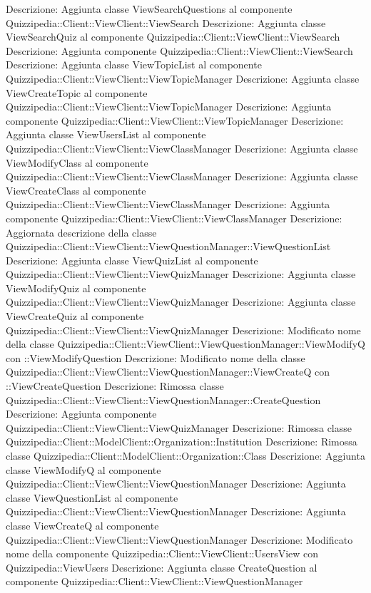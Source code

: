 Descrizione: Aggiunta classe ViewSearchQuestions al componente Quizzipedia::Client::ViewClient::ViewSearch 
Descrizione: Aggiunta classe ViewSearchQuiz al componente Quizzipedia::Client::ViewClient::ViewSearch 
Descrizione: Aggiunta componente Quizzipedia::Client::ViewClient::ViewSearch 
Descrizione: Aggiunta classe ViewTopicList al componente Quizzipedia::Client::ViewClient::ViewTopicManager 
Descrizione: Aggiunta classe ViewCreateTopic al componente Quizzipedia::Client::ViewClient::ViewTopicManager 
Descrizione: Aggiunta componente Quizzipedia::Client::ViewClient::ViewTopicManager 
Descrizione: Aggiunta classe ViewUsersList al componente Quizzipedia::Client::ViewClient::ViewClassManager 
Descrizione: Aggiunta classe ViewModifyClass al componente Quizzipedia::Client::ViewClient::ViewClassManager 
Descrizione: Aggiunta classe ViewCreateClass al componente Quizzipedia::Client::ViewClient::ViewClassManager 
Descrizione: Aggiunta componente Quizzipedia::Client::ViewClient::ViewClassManager 
Descrizione: Aggiornata descrizione della classe Quizzipedia::Client::ViewClient::ViewQuestionManager::ViewQuestionList 
Descrizione: Aggiunta classe ViewQuizList al componente Quizzipedia::Client::ViewClient::ViewQuizManager 
Descrizione: Aggiunta classe ViewModifyQuiz al componente Quizzipedia::Client::ViewClient::ViewQuizManager 
Descrizione: Aggiunta classe ViewCreateQuiz al componente Quizzipedia::Client::ViewClient::ViewQuizManager 
Descrizione: Modificato nome della classe Quizzipedia::Client::ViewClient::ViewQuestionManager::ViewModifyQ con ::ViewModifyQuestion 
Descrizione: Modificato nome della classe Quizzipedia::Client::ViewClient::ViewQuestionManager::ViewCreateQ con ::ViewCreateQuestion 
Descrizione: Rimossa classe Quizzipedia::Client::ViewClient::ViewQuestionManager::CreateQuestion 
Descrizione: Aggiunta componente Quizzipedia::Client::ViewClient::ViewQuizManager 
Descrizione: Rimossa classe Quizzipedia::Client::ModelClient::Organization::Institution 
Descrizione: Rimossa classe Quizzipedia::Client::ModelClient::Organization::Class 
Descrizione: Aggiunta classe ViewModifyQ al componente Quizzipedia::Client::ViewClient::ViewQuestionManager 
Descrizione: Aggiunta classe ViewQuestionList al componente Quizzipedia::Client::ViewClient::ViewQuestionManager 
Descrizione: Aggiunta classe ViewCreateQ al componente Quizzipedia::Client::ViewClient::ViewQuestionManager 
Descrizione: Modificato nome della componente Quizzipedia::Client::ViewClient::UsersView con Quizzipedia::ViewUsers 
Descrizione: Aggiunta classe CreateQuestion al componente Quizzipedia::Client::ViewClient::ViewQuestionManager 
